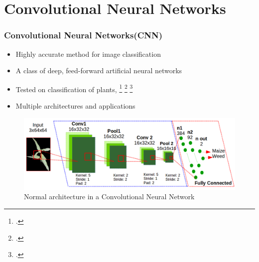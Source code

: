 \documentclass[10pt,a4paper]{beamer}
\begin{document}
\section{Convolutional Neural Networks}
\begin{frame}
\frametitle{Convolutional Neural Networks(CNN)}
\begin{itemize}
	\item Highly accurate method for image classification
	\item A class of deep, feed-forward artificial neural networks
	\item Tested on classification of plants, \footcite{cheng2015feature} \footcite{potena2016fast} \footcite{di2016automatic}
	\item Multiple architectures and applications
\end{itemize}
	\begin{figure}[h]
	\centering
	\includegraphics[width=3.5 in]{arquitectura}
	\caption{Normal architecture in a Convolutional Neural Network}
	\label{figure4}
	\end{figure}
\end{frame}
\end{document}
